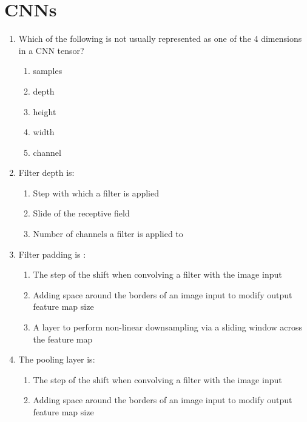 \documentclass{report}
\numberwithin{equation}{section}
\begin{document}
\section{CNNs}
\begin{enumerate}
\item Which of the following is not usually represented as one of the 4 dimensions in a CNN tensor?
\begin{enumerate}[label=\alph*.]
\item samples
\item depth
\item height
\item width
\item channel
\end{enumerate}
\item Filter depth is:
\begin{enumerate}[label=\alph*.]
\item Step with which a filter is applied
\item Slide of the receptive field
\item Number of channels a filter is applied to
\end{enumerate}
\item Filter padding is :
\begin{enumerate}[label=\alph*.]
\item The step of the shift when convolving a filter with the image input
\item Adding space around the borders of an image input to modify output feature map size
\item A layer to perform non-linear downsampling via a sliding window across the feature map
\end{enumerate}
\item The pooling layer is:
\begin{enumerate}[label=\alph*.]
\item The step of the shift when convolving a filter with the image input
\item Adding space around the borders of an image input to modify output feature map size

\end{enumerate}
\end{enumerate}
\end{document}
